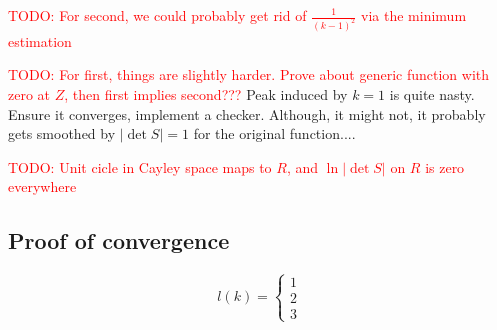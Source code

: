\documentclass[12pt, a4paper]{article}
\newcommand{\abs}[1]{\left| #1 \right|}
\newcommand{\todo}[1]{{\large \textcolor{red}{TODO: #1}}}
\begin{document}
\todo{For second, we could probably get rid of $\frac{1}{(k-1)^2}$ via the minimum estimation}

\todo{For first, things are slightly harder. Prove about generic function with zero at $Z$, then first implies second???}
Peak induced by $k=1$ is quite nasty. Ensure it converges, implement a checker. Although, it might not, it probably gets smoothed by $\abs{\det S} = 1$ for the original function....


\todo{Unit cicle in Cayley space maps to $R$, and $\ln\abs{\det S}$ on $R$ is zero everywhere}

\subsection*{Proof of convergence}

\[
l(k) =
\begin{cases}
1 \\
2 \\
3 
\end{cases}
\]
\end{document}
